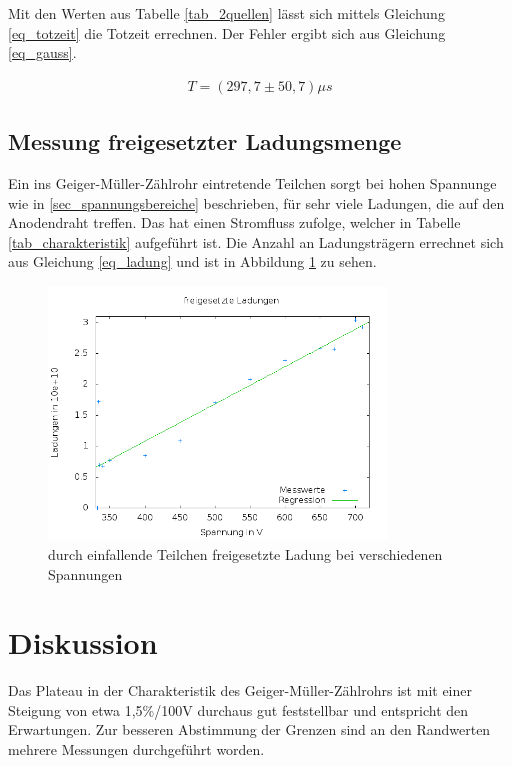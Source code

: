 Mit den Werten aus Tabelle \ref{tab_2quellen} lässt sich mittels Gleichung \eqref{eq_totzeit} die Totzeit errechnen. Der Fehler ergibt
sich aus Gleichung \eqref{eq_gauss}.

\begin{align}
 T = (297,7 \pm 50,7) \mu s
\end{align}

\subsection{Messung freigesetzter Ladungsmenge}
Ein ins Geiger-Müller-Zählrohr eintretende Teilchen sorgt bei hohen Spannunge wie in \ref{sec_spannungsbereiche} beschrieben, für sehr
viele Ladungen, die auf den Anodendraht treffen. Das hat einen Stromfluss zufolge, welcher in Tabelle \ref{tab_charakteristik}
aufgeführt ist. Die Anzahl an Ladungsträgern errechnet sich aus Gleichung \eqref{eq_ladung} und ist in Abbildung \ref{pic_ladung} zu
sehen.

\begin{figure}[H]
 \includegraphics[width=0.8\textwidth]{pics/ladungen.png}
 \caption{durch einfallende Teilchen freigesetzte Ladung bei verschiedenen Spannungen}
 \label{pic_ladung}
\end{figure}

\section{Diskussion}
Das Plateau in der Charakteristik des Geiger-Müller-Zählrohrs ist mit einer Steigung von etwa 1,5\%/100V durchaus gut feststellbar
und entspricht den Erwartungen. Zur besseren Abstimmung der Grenzen sind an den Randwerten mehrere Messungen durchgeführt worden.

